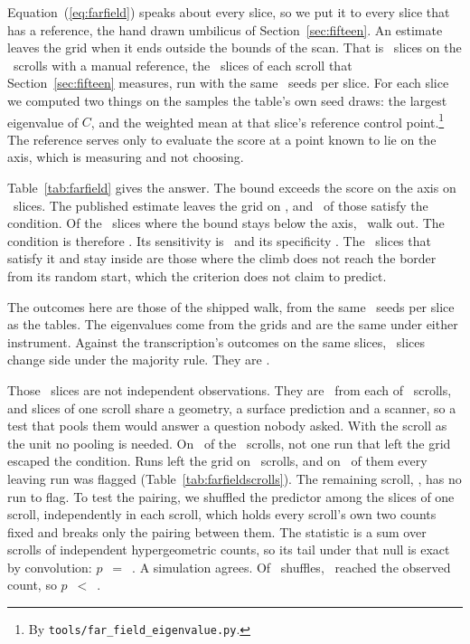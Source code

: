 Equation~(\ref{eq:farfield}) speaks about every slice, so we put it to every slice that has a
reference, the hand drawn umbilicus of Section~\ref{sec:fifteen}. An estimate leaves the grid when
it ends outside the bounds of the scan. That is \RevFarSlicesTotal\ slices on the \RevFarScrolls\
scrolls with a manual reference, the \RevFifteenSlices\ slices of each scroll that
Section~\ref{sec:fifteen} measures, run with the same \RevKSeeds\ seeds per slice. For each slice
we computed two things on the samples the table's own seed draws: the largest eigenvalue of $C$,
and the weighted mean at that slice's reference control point.\footnote{By
\texttt{tools/far\_field\_eigenvalue.py}.} The reference serves only to evaluate the score at a
point known to lie on the axis, which is measuring and not choosing.

Table~\ref{tab:farfield} gives the answer. The bound exceeds the score on the axis on
\RevFarPredictedYes\ slices. The published estimate leaves the grid on \RevFarRunaways, and
\RevFarTruePos\ of those satisfy the condition. Of the \RevFarPredictedNo\ slices where the bound
stays below the axis, \RevFarFalseNeg\ walk out. The condition is therefore \RevFarNecessity. Its
sensitivity is \RevFarSensitivity\ and its specificity \RevFarSpecificity. The \RevFarFalsePos\
slices that satisfy it and stay inside are those where the climb does not reach the border from its
random start, which the criterion does not claim to predict.

The outcomes here are those of the shipped walk, from the same \RevKSeeds\ seeds per slice as the
tables. The eigenvalues come from the grids and are the same under either instrument. Against the
transcription's outcomes on the same slices, \RevFarSidesChanged\ slices change side under the
majority rule. They are \RevFarSidesChangedSlices. \RevFarMissSentence

Those \RevFarSlicesTotal\ slices are not independent observations. They are
\RevFarScrollSlicesEach\ from each of \RevFarScrollUnit\ scrolls, and slices of one scroll share a
geometry, a surface prediction and a scanner, so a test that pools them would answer a question
nobody asked. With the scroll as the unit no pooling is needed. On \RevFarScrollsZeroMisses\ of the
\RevFarScrollUnit\ scrolls, not one run that left the grid escaped the condition. Runs left the grid
on \RevFarScrollsWithLeaving\ scrolls, and on \RevFarScrollsAllFlagged\ of them every leaving run was
flagged (Table~\ref{tab:farfieldscrolls}). The remaining scroll, \RevFarScrollNoLeaving, has no run
to flag. To test the pairing, we shuffled the predictor among the slices of one scroll,
independently in each scroll, which holds every scroll's own two counts fixed and breaks only the
pairing between them. The statistic is a sum over scrolls of independent hypergeometric counts, so
its tail under that null is exact by convolution: $p$~$=$~\RevFarPermExactP. A simulation agrees.
Of \RevFarPermRounds\ shuffles, \RevFarPermHits\ reached the observed count, so
$p$~$<$~\RevFarPermP.

